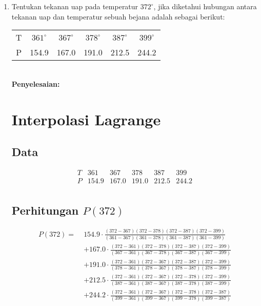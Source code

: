 \documentclass{article}
\newcommand{\penyelesaian}{\textbf{Penyelesaian: }}
\begin{document}
\begin{enumerate}
\begin{enumerate}
    \end{enumerate}

    \item Tentukan tekanan uap pada temperatur $372^{\circ}$, jika diketahui hubungan antara tekanan uap dan temperatur sebuah bejana adalah sebagai berikut: \\
        \begin{tabular}{ c c c c c c }
        T & $361^{\circ}$ & $367^{\circ}$ & $378^{\circ}$ & $387^{\circ}$ & $399^{\circ}$ \\
        P & \num{154,9} & \num{167,0} & \num{191,0} & \num{212,5} & \num{244,2} \\
    \end{tabular} \\
    \penyelesaian \\
    \section*{Interpolasi Lagrange}

    \subsection*{Data}
    \[
    \begin{array}{c|ccccc}
    T & 361 & 367 & 378 & 387 & 399 \\
    \hline
    P & 154.9 & 167.0 & 191.0 & 212.5 & 244.2 \\
    \end{array}
    \]

    \subsection*{Perhitungan \( P(372) \)}


    \begin{align*}
    P(372) = \;& 154.9 \cdot \frac{(372-367)(372-378)(372-387)(372-399)}{(361-367)(361-378)(361-387)(361-399)} \\
    & + 167.0 \cdot \frac{(372-361)(372-378)(372-387)(372-399)}{(367-361)(367-378)(367-387)(367-399)} \\
    & + 191.0 \cdot \frac{(372-361)(372-367)(372-387)(372-399)}{(378-361)(378-367)(378-387)(378-399)} \\
    & + 212.5 \cdot \frac{(372-361)(372-367)(372-378)(372-399)}{(387-361)(387-367)(387-378)(387-399)} \\
    & + 244.2 \cdot \frac{(372-361)(372-367)(372-378)(372-387)}{(399-361)(399-367)(399-378)(399-387)}
    \end{align*}


\end{enumerate}
\end{document}
